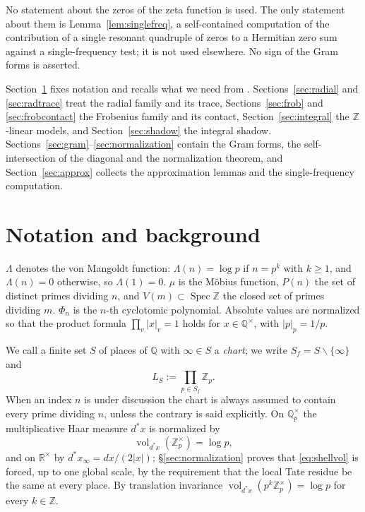 \documentclass[11pt]{amsart}
\theoremstyle{definition}
\theoremstyle{remark}
\newcommand{\R}{\mathbb R}
\newcommand{\Z}{\mathbb Z}
\newcommand{\Q}{\mathbb Q}
\newcommand{\Spec}{\operatorname{Spec}}
\newcommand{\vol}{\operatorname{vol}}
\begin{document}
No statement about the zeros of the zeta function is used.  The only statement
about them is Lemma~\ref{lem:singlefreq}, a self-contained computation of the
contribution of a single resonant quadruple of zeros to a Hermitian zero sum
against a single-frequency test; it is not used elsewhere.  No sign of the
Gram forms is asserted.

Section~\ref{sec:prelim} fixes notation and recalls what we need from
\cite{Companion}.  Sections~\ref{sec:radial} and \ref{sec:radtrace} treat the
radial family and its trace, Sections~\ref{sec:frob} and \ref{sec:frobcontact}
the Frobenius family and its contact, Section~\ref{sec:integral} the
$\Z$-linear models, and Section~\ref{sec:shadow} the integral shadow.
Sections~\ref{sec:gram}--\ref{sec:normalization} contain the Gram forms, the
self-intersection of the diagonal and the normalization theorem, and
Section~\ref{sec:approx} collects the approximation lemmas and the
single-frequency computation.

\section{Notation and background}\label{sec:prelim}

$\Lambda$ denotes the von Mangoldt function: $\Lambda(n)=\log p$ if $n=p^k$
with $k\ge1$, and $\Lambda(n)=0$ otherwise, so $\Lambda(1)=0$. $\mu$ is the
M\"obius function, $P(n)$ the set of distinct primes dividing $n$, and
$V(m)\subset\Spec\Z$ the closed set of primes dividing $m$. $\Phi_n$ is the
$n$-th cyclotomic polynomial. Absolute values are normalized so that the
product formula $\prod_v|x|_v=1$ holds for $x\in\Q^\times$, with
$|p|_p=1/p$.

We call a finite set $S$ of places of $\Q$ with $\infty\in S$ a
\emph{chart}; we write $S_f=S\smallsetminus\{\infty\}$ and
\[
  L_S:=\prod_{p\in S_f}\Z_p .
\]
When an index $n$ is under discussion the chart is always assumed to contain
every prime dividing $n$, unless the contrary is said explicitly. On $\Q_p^\times$
the multiplicative Haar measure $d^*x$ is normalized by
\begin{equation}\label{eq:shellvol}
   \vol_{d^*x}(\Z_p^\times)=\log p ,
\end{equation}
and on $\R^\times$ by $d^*x_\infty=dx/(2|x|)$; \S\ref{sec:normalization} proves
that \eqref{eq:shellvol} is forced, up to one global scale, by the requirement
that the local Tate residue be the same at every place. By translation
invariance $\vol_{d^*x}(p^k\Z_p^\times)=\log p$ for every $k\in\Z$.
\end{document}
